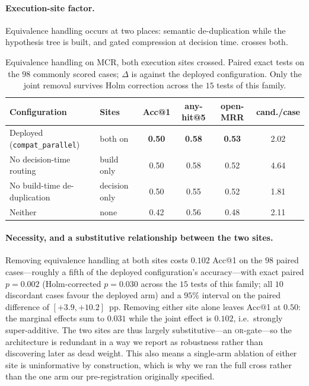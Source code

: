 \paragraph{Execution-site factor.}
Equivalence handling occurs at two places: semantic de-duplication while the hypothesis tree is built, and gated compression at decision time.
 crosses both.

\begin{table}[t]
\centering
\small
\caption{Equivalence handling on MCR, both execution sites crossed. Paired exact tests on the $98$ commonly scored cases; $\Delta$ is against the deployed configuration. Only the joint removal survives Holm correction across the $15$ tests of this family.}
\label{tab:eq-site}
\begin{tabular}{llcccc}
\toprule
Configuration & Sites & Acc@1 & any-hit@5 & open-MRR & cand./case \\
\midrule
Deployed (\texttt{compat\_parallel}) & both on & \textbf{0.50} & \textbf{0.58} & \textbf{0.53} & 2.02 \\
No decision-time routing & build only & 0.50 & 0.58 & 0.52 & 4.64 \\
No build-time de-duplication & decision only & 0.50 & 0.55 & 0.52 & 1.81 \\
Neither & none & 0.42 & 0.56 & 0.48 & 2.11 \\
\bottomrule
\end{tabular}
\end{table}

\paragraph{Necessity, and a substitutive relationship between the two sites.}
Removing equivalence handling at both sites costs $0.102$ Acc@1 on the $98$ paired cases---roughly a fifth of the deployed configuration's accuracy---with exact paired $p=0.002$ (Holm-corrected $p=0.030$ across the $15$ tests of this family; all $10$ discordant cases favour the deployed arm) and a $95\%$ interval on the paired difference of $[+3.9, +10.2]$~pp.
Removing either site alone leaves Acc@1 at $0.50$: the marginal effects sum to $0.031$ while the joint effect is $0.102$, i.e.\ strongly super-additive.
The two sites are thus largely substitutive---an \textsc{or}-gate---so the architecture is redundant in a way we report as robustness rather than discovering later as dead weight.
This also means a single-arm ablation of either site is uninformative by construction, which is why we ran the full cross rather than the one arm our pre-registration originally specified.

